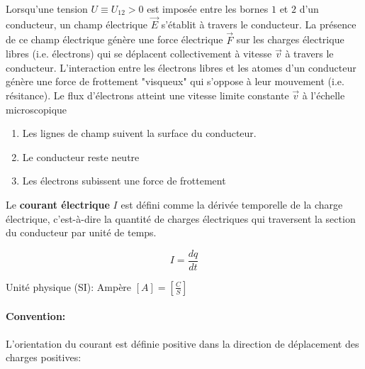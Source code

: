 \documentclass[
    11pt,
    a4paper,
    oneside,
    headinlcude, footinclude,
    twoside,
]{report}
\renewcommand{\vec}[1]{\overrightarrow{#1}}
\begin{document}
Lorsqu'une tension $U \equiv U_{12} > 0$ est imposée entre les bornes $1$ et
$2$ d'un conducteur, un champ électrique $\vec E$ s'établit à travers le
conducteur. La présence de ce champ électrique génère une force électrique $\vec F$
sur les charges électrique libres (i.e. électrons) qui se déplacent
collectivement à vitesse $\vec v$ à travers le conducteur. L'interaction entre
les électrons libres et les atomes d'un conducteur génère une force de
frottement "visqueux" qui s'oppose à leur mouvement (i.e. résitance). Le flux
d'électrons atteint une vitesse limite constante $\vec v$ à l'échelle
microscopique

\begin{center}
    \begin{minipage}{.5\linewidth}
    \end{minipage}
    \begin{minipage}{.49\linewidth}
        \setlength{\parskip}{.3em}
        \begin{enumerate}
            \item Les lignes de champ suivent la surface du conducteur.

            \item Le conducteur reste neutre

            \item Les électrons subissent une force de frottement
        \end{enumerate}
    \end{minipage}
\end{center}

Le \textbf{courant électrique}  $I$ est défini comme la dérivée temporelle de la
charge électrique, c'est-à-dire la quantité de charges électriques qui
traversent la section du conducteur par unité de temps.

\begin{equation}
    \label{eq:8.1}
    I = \frac{dq}{dt}
\end{equation}

Unité physique (SI): Ampère $[A] = \left[\frac{C}{S}\right]$

\paragraph{Convention:}
\label{par:convention_}

L'orientation du courant est définie positive dans la direction de déplacement
des charges positives:
\end{document}
